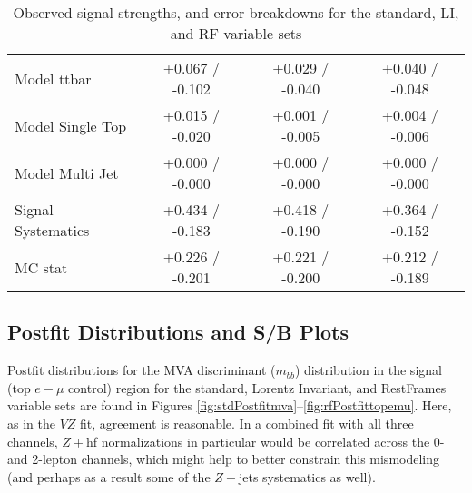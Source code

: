 \begin{table}[!htbp]
\begin{center}
\begin{tabular}{lccc}
Model ttbar &  +0.067 / -0.102  &  +0.029 / -0.040  &  +0.040 / -0.048 \\
Model Single Top &  +0.015 / -0.020  &  +0.001 / -0.005  &  +0.004 / -0.006 \\
Model Multi Jet &  +0.000 / -0.000  &  +0.000 / -0.000  &  +0.000 / -0.000 \\
Signal Systematics &  +0.434 / -0.183  &  +0.418 / -0.190  &  +0.364 / -0.152 \\
MC stat &  +0.226 / -0.201  &  +0.221 / -0.200  &  +0.212 / -0.189 \\
\hline\hline
\end{tabular}
\end{center}
\caption{Observed signal strengths, and error breakdowns for the standard, LI, and RF variable sets}
\label{tab:breakdownobs}
\end{table}
\clearpage

\subsection{Postfit Distributions and S/B Plots}
Postfit distributions for the MVA discriminant ($m_{bb}$) distribution in the signal (top $e-\mu$ control) region for the standard, Lorentz Invariant, and RestFrames variable sets are found in Figures \ref{fig:stdPostfitmva}--\ref{fig:rfPostfittopemu}.  Here, as in the $VZ$ fit, agreement is reasonable.  In a combined fit with all three channels, $Z+$hf normalizations in particular would be correlated across the 0- and 2-lepton channels, which might help to better constrain this mismodeling (and perhaps as a result some of the $Z+$jets systematics as well).

